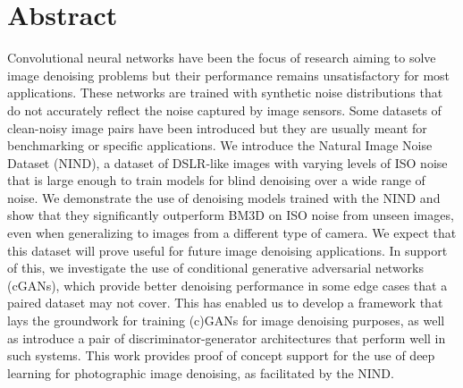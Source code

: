 \begingroup
\let\clearpage\relax
\let\cleardoublepage\relax
\let\cleardoublepage\relax

\chapter*{Abstract}


Convolutional neural networks have been the focus of research aiming to solve image denoising problems but their performance remains unsatisfactory for most applications. These networks are trained with synthetic noise distributions that do not accurately reflect the noise captured by image sensors. Some datasets of clean-noisy image pairs have been introduced but they are usually meant for benchmarking or specific applications. We introduce the Natural Image Noise Dataset (NIND), a dataset of DSLR-like images with varying levels of ISO noise that is large enough to train models for blind denoising over a wide range of noise. We demonstrate the use of denoising models trained with the NIND and show that they significantly outperform BM3D on ISO noise from unseen images, even when generalizing to images from a different type of camera. We expect that this dataset will prove useful for future image denoising applications. In support of this, we investigate the use of conditional generative adversarial networks (cGANs), which provide better denoising performance in some edge cases that a paired dataset may not cover. This has enabled us to develop a framework that lays the groundwork for training (c)GANs for image denoising purposes, as well as introduce a pair of discriminator-generator architectures that perform well in such systems. This work provides proof of concept support for the use of deep learning for photographic image denoising, as facilitated by the NIND.

